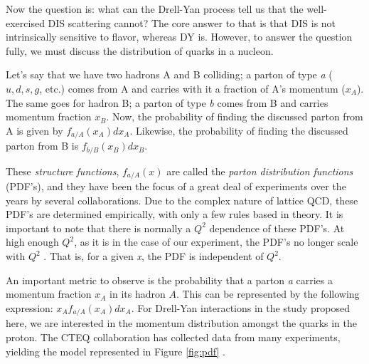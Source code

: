Now the question is: what can the Drell-Yan process tell us that the well-exercised DIS scattering cannot? The core answer to that is that DIS is not intrinsically sensitive to flavor, whereas DY is. However, to answer the question fully, we must discuss the distribution of quarks in a nucleon.  

Let's say that we have two hadrons A and B colliding; a parton of type \emph{a} ($u, d, s, g$, etc.) comes from A and carries with it a fraction of A's momentum ($x_A$).  The same goes for hadron B; a parton of type \emph{b} comes from B and carries momentum fraction $x_B$. Now, the probability of finding the discussed parton from A is given by $f_{a/A}(x_A)dx_A$. Likewise, the probability of finding the discussed parton from B is $f_{b/B}(x_B)dx_B$.  

These \emph{structure functions}, $f_{a/A}(x)$ are called the \emph{parton distribution functions} (PDF's), and they have been the focus of a great deal of experiments over the years by several collaborations. Due to the complex nature of lattice QCD, these PDF's are determined empirically, with only a few rules based in theory. It is important to note that there is normally a $Q^2$ dependence of these PDF's. At high enough $Q^2$, as it is in the case of our experiment, the PDF's no longer scale with $Q^2$ \cite{Seely:2009gt}.  That is, for a given \emph{x}, the PDF is independent of $Q^2$.

An important metric to observe is the probability that a parton \emph{a} carries a momentum fraction $x_A$ in its hadron $A$.  This can be represented by the following expression: $x_A f_{a/A}(x_A)dx_A$. For Drell-Yan interactions in the study proposed here, we are interested in the momentum distribution amongst the quarks in the proton.  The CTEQ collaboration has collected data from many experiments, yielding the model represented in Figure \ref{fig:pdf} \cite{Pumplin:2002vw}.

